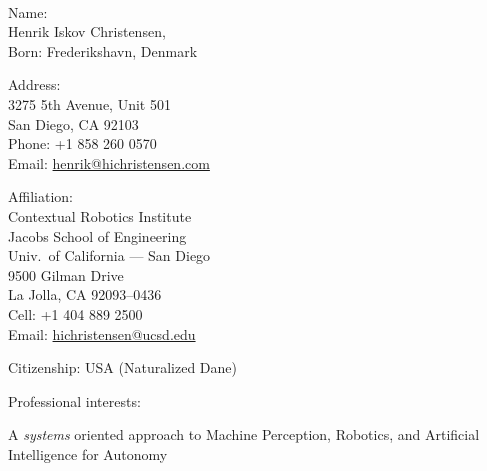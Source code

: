\documentclass{article}
\begin{document}
\begin{cv}


  \noindent
  \begin{cvlist}{~}
  \item[Name:]\ \\
    Henrik Iskov Christensen,\\
    Born: Frederikshavn, Denmark\\
  \item[Address:]\ \\
    3275 5th Avenue, Unit 501\\
    San Diego, CA 92103\\
    Phone: +1 858 260 0570\\
    Email: \url{henrik@hichristensen.com}\\
  \item[Affiliation:]\ \\
    Contextual Robotics Institute\\
    Jacobs School of Engineering\\
    Univ.~of California --- San Diego\\
    9500 Gilman Drive\\
    La Jolla, CA 92093--0436\\
    Cell: +1 404 889 2500\\
    Email: \url{hichristensen@ucsd.edu}\\
  \item[Citizenship:] USA (Naturalized Dane)
  \end{cvlist}

  \begin{cvlist}{Professional interests:}
  \item A {\em systems}\/ oriented approach to Machine Perception,
    Robotics, and Artificial Intelligence for Autonomy
  \end{cvlist}




\end{cv}
\end{document}
